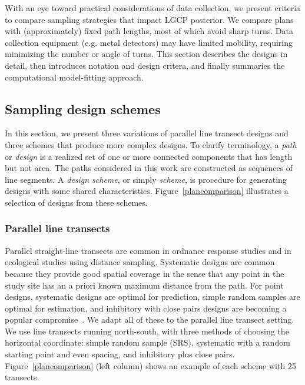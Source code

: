\documentclass[review]{elsarticle}
\begin{document}
With an eye toward practical considerations of data collection, we present
criteria to compare sampling strategies that impact LGCP posterior. We compare
plans with (approximately) fixed path lengths, most of which avoid sharp turns.
Data collection equipment (e.g. metal detectors) may have limited mobility,
requiring minimizing the number or angle of turns. This section describes the
designs in detail, then introduces notation and design critera, and finally
summaries the computational model-fitting approach.


\subsection{Sampling design schemes}
\label{methodschemes}

In this section, we present three variations of parallel line transect designs
and three schemes that produce more complex designs. To clarify terminology, a
\emph{path} or \emph{design} is a realized set of one or more connected
components that has length but not area. The paths considered in this work are
constructed as sequences of line segments. A \emph{design scheme}, or simply
\emph{scheme}, is procedure for generating designs with some shared
characteristics. Figure~\ref{plancomparison} illustrates a selection of designs
from these schemes.


\subsubsection{Parallel line transects}

Parallel straight-line transects are common in ordnance response studies and in
ecological studies using distance sampling. Systematic designs are common
because they provide good spatial coverage in the sense that any point in the
study site has an a priori known maximum distance from the path. For point
designs, systematic designs are optimal for prediction, simple random samples
are optimal for estimation, and inhibitory with close pairs designs are
becoming a popular compromise~\citep{chipetaetal2017}. We adapt all of these to
the parallel line transect setting. We use line transects running north-south,
with three methods of choosing the horizontal coordinate: simple random sample
(SRS), systematic with a random starting point and even spacing, and inhibitory
plus close pairs. Figure~\ref{plancomparison} (left column) shows an example of
each scheme with 25 transects.

\end{document}
